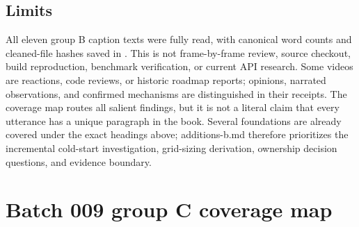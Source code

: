 \subsection{Limits}\label{appendix-877738f6f4d2-limits}

\hypertarget{appendix-877738f6f4d2-limits}{}

All eleven group B caption texts were fully read, with canonical word counts and cleaned-file hashes saved in . This is not frame-by-frame review, source checkout, build reproduction, benchmark verification, or current API research. Some videos are reactions, code reviews, or historic roadmap reports; opinions, narrated observations, and confirmed mechanisms are distinguished in their receipts. The coverage map routes all salient findings, but it is not a literal claim that every utterance has a unique paragraph in the book. Several foundations are already covered under the exact headings above; additions-b.md therefore prioritizes the incremental cold-start investigation, grid-sizing derivation, ownership decision questions, and evidence boundary.

\section{Batch 009 group C coverage map}\label{appendix-877738f6f4d2-batch-009-group-c-coverage-map}

\hypertarget{appendix-877738f6f4d2-batch-009-group-c-coverage-map}{}

